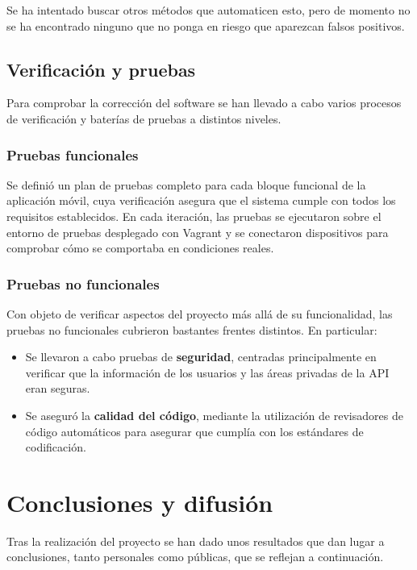 \documentclass[a4paper,12pt]{article}
\begin{document}
Se ha intentado buscar otros métodos que automaticen esto, pero de momento no se
ha encontrado ninguno que no ponga en riesgo que aparezcan falsos positivos.


\subsection{Verificación y pruebas}

Para comprobar la corrección del software se han llevado a cabo varios procesos
de verificación y baterías de pruebas a distintos niveles.

\subsubsection{Pruebas funcionales}

Se definió un plan de pruebas completo para cada bloque funcional de la
aplicación móvil, cuya verificación asegura que el sistema cumple con todos los
requisitos establecidos. En cada iteración, las pruebas se ejecutaron sobre el
entorno de pruebas desplegado con Vagrant y se conectaron dispositivos para
comprobar cómo se comportaba en condiciones reales.

\subsubsection{Pruebas no funcionales}

Con objeto de verificar aspectos del proyecto más allá de su funcionalidad, las
pruebas no funcionales cubrieron bastantes frentes distintos. En particular:

\begin{itemize}
\item Se llevaron a cabo pruebas de \textbf{seguridad}, centradas principalmente
  en verificar que la información de los usuarios y las áreas privadas de la API
  eran seguras.
\item Se aseguró la \textbf{calidad del código}, mediante la utilización de
  revisadores de código automáticos para asegurar que cumplía con los estándares
  de codificación.
\end{itemize}


\section{Conclusiones y difusión}

Tras la realización del proyecto se han dado unos resultados que dan lugar a
conclusiones, tanto personales como públicas, que se reflejan a continuación.
\end{document}
